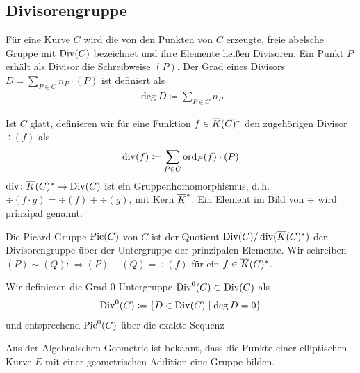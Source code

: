 
\subsection{Divisorengruppe}
\begin{Definition}[Divisorengruppe]
  Für eine Kurve $C$ wird die von den Punkten von $C$ erzeugte, freie
  abelsche Gruppe mit $\operatorname{Div}(C)$ bezeichnet und ihre
  Elemente heißen Divisoren. Ein Punkt $P$ erhält als Divisor die
  Schreibweise $(P)$. 
  Der Grad eines Divisors $D=\sum_{P\in C}n_P\cdot(P)$ ist definiert als
  \begin{gather*}
    \deg D \coloneqq \sum_{P\in C} n_P
  \end{gather*}
  
  Ist $C$ glatt, definieren wir für eine Funktion
  $f\in\overline K(C)^*$ den zugehörigen Divisor $\div(f)$
  als
  \begin{gather*}
    \operatorname{div}(f) \coloneqq \sum_{P\in C}\operatorname{ord}_P(f)\cdot(P)
  \end{gather*}
  $\operatorname{div}\colon\overline K(C)^*\to\operatorname{Div}(C)$ ist ein Gruppenhomomorphismus,
  d.\,h. $\div(f\cdot g)=\div(f)+\div(g)$,
  mit Kern $\overline K^*$.
  Ein Element im Bild von $\div$ wird prinzipal genannt.
  
  Die Picard-Gruppe $\operatorname{Pic}(C)$ von $C$ ist der Quotient
  $\operatorname{Div}(C)/\operatorname{div}(\overline K(C)^*)$ der Divisorengruppe über der Untergruppe
  der prinzipalen Elemente. Wir schreiben 
  $(P)\sim(Q):\Leftrightarrow (P)-(Q)=\div(f)$ für ein $f\in\overline K(C)^*$.

  Wir definieren die Grad-0-Untergruppe $\operatorname{Div}^0(C)\subset\operatorname{Div}(C)$ als
  \begin{gather*}
    \operatorname{Div}^0(C) \coloneqq \left\{ D\in\operatorname{Div}(C) \;\middle|\; \deg D=0 \right\}
  \end{gather*}
  und entsprechend $\operatorname{Pic}^0(C)$ über die exakte Sequenz
  \begin{center}
  \end{center}
\end{Definition}

Aus der Algebraischen Geometrie ist bekannt, dass die Punkte einer
elliptischen Kurve $E$ mit einer geometrischen Addition eine Gruppe
bilden.

